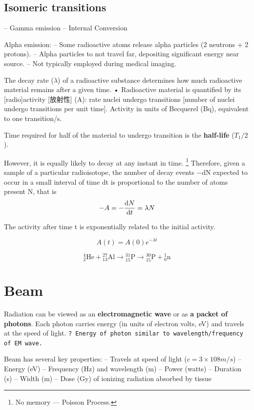\documentclass[UTF8,a4paper,11pt]{book}
\theoremstyle{mystyle}{
  \newtheorem{example}{Example}
}
\begin{document}
 \subsection{Isomeric transitions}

– Gamma emission
– Internal Conversion


 Alpha emission:
– Some radioactive atoms release alpha particles (2
neutrons + 2 protons).
– Alpha particles to not travel far, depositing
significant energy near source.
– Not typically employed during medical imaging.


The decay rate ($\lambda$) of a radioactive substance
determines how much radioactive material
remains after a given time.
• Radioactive material is quantified by its
[radio]activity [放射性] (A): rate nuclei undergo transitions [number of nuclei undergo transitions per unit time].
 Activity in units of Becquerel (Bq), equivalent
to one transition/s.

Time required for half of the material to undergo
transition is the \textbf{half-life} ($T_1/2$ ).

However, it is equally likely to decay at any instant in time. \footnote{No memory --- Poisson Process.} Therefore, given a sample of a particular radioisotope, the number of decay events −dN expected to occur in a small interval of time dt is proportional to the number of atoms present N, that is
\begin{equation}
-A = -\dv{N}{t} = \lambda N
\end{equation}

The activity after time t is exponentially
related to the initial activity.



\begin{equation}
A(t) = A(0) e^{-\lambda t}
\end{equation}

\[
{}^4_2\textrm{He} + {}^{27}_{13}\textrm{Al} \to {}^{31}_{15}\textrm{P} \to {}^{30}_{15}\textrm{P} + {}^1_0\textrm{n}
\]


\section{Beam}
Radiation can be viewed as
an \textbf{electromagnetic wave}
or as \textbf{a packet of photons}.
 Each photon carries energy
(in units of electron volts,
eV) and travels at the
speed of light.
{\tt ? Energy of photon similar to
wavelength/frequency of
EM wave.}

 Beam has several key properties:
– Travels at speed of light ($c = 3 \times 10 8 m/s$)
– Energy (eV)
– Frequency (Hz) and wavelength (m)
– Power (watts)
– Duration (s)
– Width (m)
– Dose (Gy) of ionizing radiation absorbed by tissue
\end{document}
